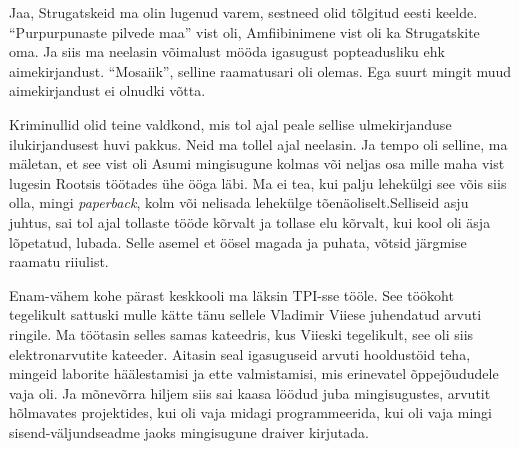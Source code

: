 Jaa, Strugatskeid ma olin lugenud varem, sestneed olid tõlgitud eesti keelde. \enquote{Purpurpunaste pilvede maa} vist oli,  Amfiibinimene vist oli ka Strugatskite oma. Ja siis ma neelasin võimalust mööda igasugust popteadusliku ehk aimekirjandust. \enquote{Mosaiik}, selline raamatusari oli olemas. Ega suurt mingit muud aimekirjandust ei olnudki võtta.

Kriminullid olid teine valdkond, mis tol ajal peale sellise ulmekirjanduse ilukirjandusest huvi pakkus. Neid ma tollel ajal neelasin. Ja tempo oli selline, ma mäletan, et see vist oli Asumi mingisugune kolmas või neljas osa mille maha vist lugesin Rootsis töötades ühe ööga läbi. Ma ei tea, kui palju lehekülgi see võis siis olla, mingi \emph{paperback}, kolm või nelisada lehekülge tõenäoliselt.Selliseid asju juhtus, sai tol ajal tollaste tööde kõrvalt ja tollase elu kõrvalt, kui  kool oli äsja lõpetatud, lubada. Selle asemel et öösel magada ja puhata, võtsid järgmise raamatu riiulist.


Enam-vähem kohe pärast keskkooli ma läksin TPI-sse tööle. See töökoht tegelikult sattuski mulle kätte tänu sellele Vladimir Viiese juhendatud arvuti ringile. Ma töötasin selles samas kateedris, kus Viieski tegelikult, see oli siis elektronarvutite kateeder. Aitasin seal igasuguseid arvuti hooldustöid teha, mingeid laborite häälestamisi ja  ette valmistamisi, mis erinevatel õppejõududele vaja oli. Ja mõnevõrra hiljem siis sai kaasa löödud juba mingisugustes, arvutit hõlmavates projektides,  kui oli vaja midagi programmeerida, kui oli vaja mingi sisend-väljundseadme jaoks mingisugune draiver kirjutada. 

